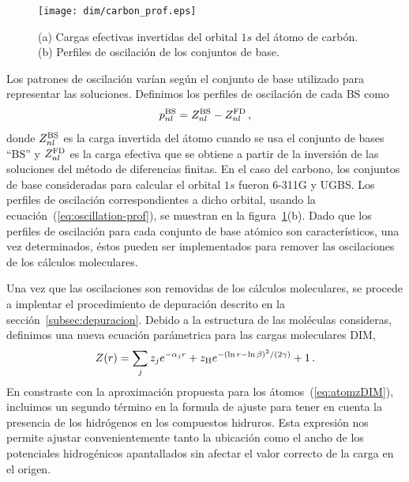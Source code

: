 \begin{figure}[t]
\centering
\texttt{[image: dim/carbon\_prof.eps]}
\caption[Inversión de funciones de onda descritas con conjuntos de base.]
{(a) Cargas efectivas invertidas del orbital $1s$ del átomo de carbón.
(b) Perfiles de oscilación de los conjuntos de base.}
\label{fig:1sCarbon}
\end{figure}

Los patrones de oscilación varían según el conjunto de base utilizado
para representar las soluciones. Definimos los perfiles de oscilación
de cada BS como
\begin{equation}
 p_{nl}^{\mbox{\scriptsize BS}} = Z_{nl}^{\mbox{\scriptsize BS}}-
 Z_{nl}^{\mbox{\scriptsize FD}} \,,
 \label{eq:oscillation-prof}
\end{equation}
donde $Z_{nl}^{\mbox{\scriptsize BS}}$ es la carga invertida del átomo
cuando se usa el conjunto de bases ``BS'' y $Z_{nl}^{\mbox{\scriptsize FD}}$ 
es la carga efectiva que se obtiene a partir de la inversión de las 
soluciones del método de diferencias finitas. En el caso del carbono,
los conjuntos de base consideradas para calcular el orbital $1s$ fueron
\mbox{6-311G} y UGBS. Los perfiles de oscilación correspondientes a
dicho orbital, usando la ecuación~(\ref{eq:oscillation-prof}), 
se muestran en la figura~\ref{fig:1sCarbon}(b). Dado que los perfiles 
de oscilación para cada conjunto de base atómico son característicos,
una vez determinados, éstos pueden ser implementados para remover las
oscilaciones de los cálculos moleculares. 

Una vez que las oscilaciones son removidas de los cálculos moleculares, 
se procede a implentar el procedimiento de depuración descrito en la
sección~\ref{subsec:depuracion}. Debido a la 
estructura de las moléculas consideras, definimos una nueva ecuación 
parámetrica para las cargas moleculares DIM,
\begin{eqnarray}
 Z(r) = \sum_j z_j e^{-\alpha_j r} 
 + z_{\mbox{\scriptsize H}} e^{-(\ln r - \ln \beta)^2/(2\gamma)} 
 + 1\,.
 \label{eq:molzDIM}
\end{eqnarray}
En constraste con la aproximación propuesta para los 
átomos~(\ref{eq:atomzDIM}), incluimos un segundo término en la 
formula de ajuste para tener en cuenta la presencia de los hidrógenos en 
los compuestos hidruros. Esta expresión nos permite ajustar 
convenientemente tanto la ubicación como el ancho de los potenciales
hidrogénicos apantallados sin afectar el valor correcto de la carga en 
el origen.


